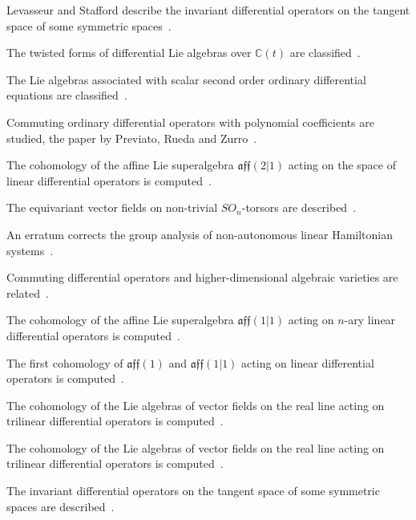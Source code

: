 Levasseur and Stafford describe the invariant differential operators on the tangent space of some symmetric spaces~\cite{WlInvariantDifferentialOperators2020}.

The twisted forms of differential Lie algebras over $\mathbb{C}(t)$ are classified~\cite{WlTwistedFormsOfDifferentialLieA2020}.

The Lie algebras associated with scalar second order ordinary differential equations are classified~\cite{WlLieAlgebrasAssociatedWithScala2020}.

Commuting ordinary differential operators with polynomial coefficients are studied, the paper by Previato, Rueda and Zurro~\cite{WlPreviatoERuedaSLZurroMACommuti2020}.

The cohomology of the affine Lie superalgebra $\mathfrak{aff}(2|1)$ acting on the space of linear differential operators is computed~\cite{WlCohomologyOfAff21ActingOnTheSp2020}.

The equivariant vector fields on non-trivial $SO_n$-torsors are described~\cite{WlEquivariantVectorFieldsOnNonTr2020}.

An erratum corrects the group analysis of non-autonomous linear Hamiltonian systems~\cite{WlErratumToGroupAnalysisOfNonAut2020}.

Commuting differential operators and higher-dimensional algebraic varieties are related~\cite{WlCommutingDifferentialOperators2020}.

The cohomology of the affine Lie superalgebra $\mathfrak{aff}(1|1)$ acting on $n$-ary linear differential operators is computed~\cite{WlCohomologyOfAff11ActingOnTheSp2020}.

The first cohomology of $\mathfrak{aff}(1)$ and $\mathfrak{aff}(1|1)$ acting on linear differential operators is computed~\cite{WlFirstCohomologyOfAff1AndAff11A2020}.

The cohomology of the Lie algebras of vector fields on the real line acting on trilinear differential operators is computed~\cite{WlCohomologyOfTheVectorFieldsLie2020}.

The cohomology of the Lie algebras of vector fields on the real line acting on trilinear differential operators is computed~\cite{WlCohomologyOfTheVectorFieldsLie2020}.

The invariant differential operators on the tangent space of some symmetric spaces are described~\cite{WlInvariantDifferentialOperators2020}.
